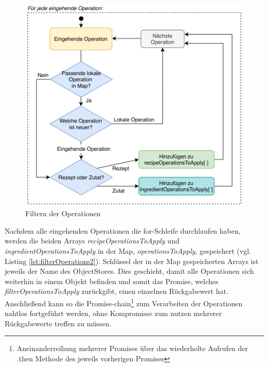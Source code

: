 \documentclass[a4paper, 12pt]{scrreprt}
\begin{document}
\begin{minipage}{\linewidth}
	
\end{minipage}

\begin{figure}[H]
	\centering
	\includegraphics[width=.80\textwidth]{flowchartFilterOperations.png}
	\caption{Filtern der Operationen}
	\label{fig:filterOperationsFlowchart}
\end{figure}

Nachdem alle eingehenden Operationen die for-Schleife durchlaufen haben, werden die beiden Arrays \textit{recipeOperationsToApply} und \textit{ingredientOperationsToApply} in der Map, \textit{operationsToApply}, gespeichert (vgl. Listing \ref{lst:filterOperations2}). Schlüssel der in der Map gespeicherten Arrays ist jeweils der Name des ObjectStores. Dies geschieht, damit alle Operationen sich weiterhin in einem Objekt befinden und somit das Promise, welches \textit{filterOperationsToApply} zurückgibt, einen einzelnen Rückgabewert hat. Anschließend kann so die Promise-chain\footnote{Aneinanderreihung mehrerer Promises über das wiederholte Aufrufen der {.then} Methode des jeweils vorherigen Promises} zum Verarbeiten der Operationen nahtlos fortgeführt werden, ohne Kompromisse zum nutzen mehrerer Rückgabewerte treffen zu müssen.

\begin{minipage}{\linewidth}
	
\end{minipage}
\end{document}
